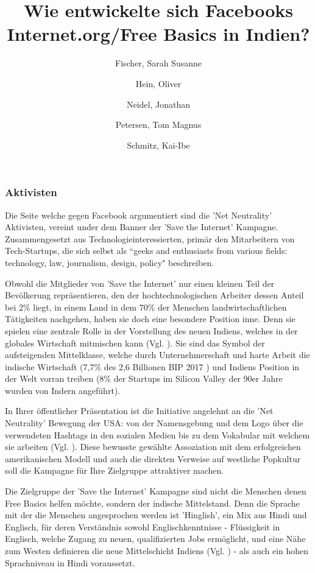 \documentclass{article}
\title{Wie entwickelte sich Facebooks Internet.org/Free Basics in Indien?}
\author{
  Fischer, Sarah Susanne\\
  \and
  Hein, Oliver\\
  \and
  Neidel, Jonathan\\
  \and
  Petersen, Tom Magnus\\
  \and
  Schmitz, Kai-Ibe\\
}
\begin{document}
\maketitle

\subsubsection{Aktivisten}


Die Seite welche gegen Facebook argumentiert sind die 'Net Neutrality' Aktivisten, vereint under dem Banner der 'Save the Internet' Kampagne.
Zusammengesetzt aus Technologieinteressierten, primär den Mitarbeitern von Tech-Startups, die sich selbst als ``geeks and enthusiasts from various fields: technology, law, journalism, design, policy" \cite{sti2015} beschreiben.


Obwohl die Mitglieder von 'Save the Internet' nur einen kleinen Teil der Bevölkerung repräsentieren, den der hochtechnologischen Arbeiter dessen Anteil bei 2\% liegt, in einem Land in dem 70\% der Menschen landwirtschaftlichen Tätigkeiten nachgehen, haben sie doch eine besondere Position inne. Denn sie spielen eine zentrale Rolle in der Vorstellung des neuen Indiens, welches in der globales Wirtschaft mitmischen kann (Vgl. \cite{thomas2012}).
Sie sind das Symbol der aufsteigenden Mittelklasse, welche durch Unternehmerschaft und harte Arbeit die indische Wirtschaft (7,7\% des 2,6 Billionen BIP 2017 \cite{statistaIndiaGDP}\cite{imfIndiaGDP}) und Indiens Position in der Welt vorran treiben (8\% der Startups im Silicon Valley der 90er Jahre wurden von Indern angeführt\cite{upadhya2004}).

In Ihrer öffentlicher Präsentation ist die Initiative angelehnt an die 'Net Neutrality' Bewegung der USA: von der Namensgebung und dem Logo über die verwendeten Hashtags in den sozialen Medien bis zu dem Vokabular mit welchem sie arbeiten (Vgl. \cite{prasad2017}). Diese bewusste gewählte Assoziation mit dem erfolgreichen amerikanischen Modell und auch die direkten Verweise auf westliche Popkultur soll die Kampagne für Ihre Zielgruppe attraktiver machen.

Die Zielgruppe der 'Save the Internet' Kampagne sind nicht die Menschen denen Free Basics helfen möchte, sondern der indische Mittelstand. Denn die Sprache mit der die Menschen angesprochen werden ist 'Hinglish', ein Mix aus Hindi und Englisch, für deren Verständnis sowohl Englischkenntnisse - Flüssigkeit in Englisch, welche Zugang zu neuen, qualifizierten Jobs ermöglicht, und eine Nähe zum Westen definieren die neue Mittelschicht Indiens (Vgl. \cite{fernandes2006}) - als auch ein hohen Sprachniveau in Hindi voraussetzt.
\end{document}
